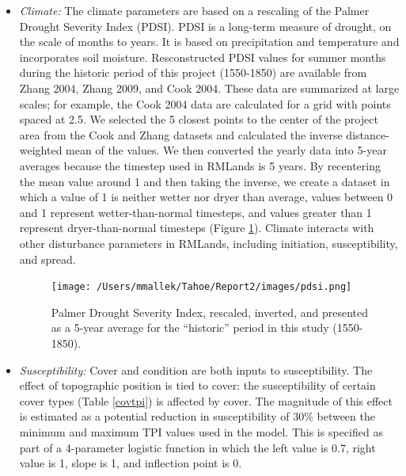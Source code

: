 \begin{itemize}
\item \emph{Climate:} The climate parameters are based on a rescaling of the Palmer Drought Severity Index (PDSI). PDSI is a long-term measure of drought, on the scale of months to years. It is based on precipitation and temperature and incorporates soil moisture. Resconstructed PDSI values for summer months during the historic period of this project (1550-1850) are available from Zhang 2004, Zhang 2009, and Cook 2004. These data are summarized at large scales; for example, the Cook 2004 data are calculated for a grid with points spaced at 2.5\textdegree. We selected the 5 closest points to the center of the project area from the Cook and Zhang datasets and calculated the inverse distance-weighted mean of the values. We then converted the yearly data into 5-year averages because the timestep used in RMLands is 5 years. By recentering the mean value around 1 and then taking the inverse, we create a dataset in which a value of 1 is neither wetter nor dryer than average, values between 0 and 1 represent wetter-than-normal timesteps, and values greater than 1 represent dryer-than-normal timesteps (Figure \ref{pdsi}). Climate interacts with other disturbance parameters in RMLands, including initiation, susceptibility, and spread.

\begin{figure}[htbp]
\centering
\texttt{[image: /Users/mmallek/Tahoe/Report2/images/pdsi.png]}
\caption{Palmer Drought Severity Index, rescaled, inverted, and presented as a 5-year average for the ``historic'' period in this study (1550-1850).} 
\label{pdsi}
\end{figure}


\item \emph{Susceptibility:} Cover and condition are both inputs to susceptibility. The effect of topographic position is tied to cover: the susceptibility of certain cover types (Table \ref{covtpi}) is affected by cover. The magnitude of this effect is estimated as a potential reduction in susceptibility of 30\% between the minimum and maximum TPI values used in the model. This is specified as part of a 4-parameter logistic function in which the left value is 0.7, right value is 1, slope is 1, and inflection point is 0. 


\end{itemize}
